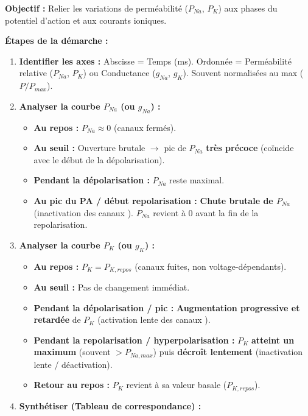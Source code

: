 \documentclass[11pt]{article}
\begin{document}
\begin{methode}
\textbf{Objectif :} Relier les variations de perméabilité ($P_{Na}$, $P_K$) aux phases du potentiel d'action et aux courants ioniques.

\textbf{Étapes de la démarche :}
\begin{enumerate}
    \item \textbf{Identifier les axes :} Abscisse = Temps (ms). Ordonnée = Perméabilité relative ($P_{Na}$, $P_K$) ou Conductance ($g_{Na}$, $g_K$). Souvent normalisées au max ($P/P_{max}$).
    \item \textbf{Analyser la courbe $P_{Na}$ (ou $g_{Na}$) :}
    \begin{itemize}
        \item \textbf{Au repos :} $P_{Na} \approx 0$ (canaux fermés).
        \item \textbf{Au seuil :} Ouverture brutale $\rightarrow$ pic de $P_{Na}$ \textbf{très précoce} (coïncide avec le début de la dépolarisation).
        \item \textbf{Pendant la dépolarisation :} $P_{Na}$ reste maximal.
        \item \textbf{Au pic du PA / début repolarisation :} \textbf{Chute brutale de $P_{Na}$} (inactivation des canaux ). $P_{Na}$ revient à 0 avant la fin de la repolarisation.
    \end{itemize}
    \item \textbf{Analyser la courbe $P_K$ (ou $g_K$) :}
    \begin{itemize}
        \item \textbf{Au repos :} $P_K = P_{K,repos}$ (canaux fuites, non voltage-dépendants).
        \item \textbf{Au seuil :} Pas de changement immédiat.
        \item \textbf{Pendant la dépolarisation / pic :} \textbf{Augmentation progressive et retardée} de $P_K$ (activation lente des canaux ).
        \item \textbf{Pendant la repolarisation / hyperpolarisation :} $P_K$ \textbf{atteint un maximum} (souvent $> P_{Na,max}$) puis \textbf{décroît lentement} (inactivation lente / déactivation).
        \item \textbf{Retour au repos :} $P_K$ revient à sa valeur basale ($P_{K,repos}$).
    \end{itemize}
    \item \textbf{Synthétiser (Tableau de correspondance) :}

\end{enumerate}
\end{methode}
\end{document}
